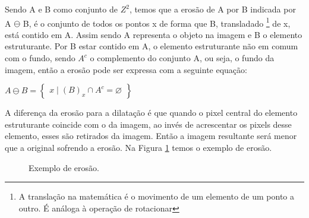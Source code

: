 Sendo A e B como conjunto de $Z^{2}$, temos que a erosão de A por B indicada por A $\ominus$ B,  é o conjunto de todos os pontos x de forma que B, transladado \footnote{A translação na matemática é o movimento de um elemento de um ponto a outro. É análoga à operação de rotacionar } de x, está contido em A. Assim sendo A representa o objeto na imagem e B o elemento estruturante. Por B estar contido em A, o elemento estruturante não em comum com o fundo, sendo $A^{c}$ o complemento do conjunto A, ou seja, o fundo da imagem, então a erosão pode ser expressa com a seguinte equação:
\cite{pdi99}

\begin{center}
    $A \ominus  B = \begin{Bmatrix}
    x\mid   (B)_{x}\cap A^{c}    =  \varnothing 
    \end{Bmatrix} $
\end{center}

A diferença da erosão para a dilatação é que quando o pixel central do elemento estruturante coincide com o da imagem, ao invés de acrescentar os pixels desse elemento, esses são retirados da imagem. Então a imagem resultante será menor que a original sofrendo a erosão. Na Figura \ref{subfig:dilatacao} temos o exemplo de erosão.

\begin{figure}[h]
 \centering
   \qquad
   \qquad
   \caption{ Exemplo de erosão. \cite{pdi99}}
  \label{subfig:dilatacao}
\end{figure}
